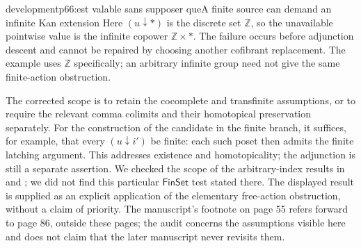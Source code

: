 \begin{dcomment}{development}{p66:est valable sans supposer que}{A finite source can demand an infinite Kan extension}
Here $(u\downarrow *)$ is the discrete set $\mathbb Z$, so the unavailable pointwise value is the infinite copower $\mathbb Z\times *$. The failure occurs before adjunction descent and cannot be repaired by choosing another cofibrant replacement. The example uses $\mathbb Z$ specifically; an arbitrary infinite group need not give the same finite-action obstruction.

The corrected scope is to retain the cocomplete and transfinite assumptions, or to require the relevant comma colimits and their homotopical preservation separately. For the construction of the candidate in the finite branch, it suffices, for example, that every $(u\downarrow i')$ be finite: each such poset then admits the finite latching argument. This addresses existence and homotopicality; the adjunction is still a separate assertion. We checked the scope of the arbitrary-index results in \citet[\S9.6]{RadulescuBanu2009} and \citet[\S2]{Cisinski2010}; we did not find this particular $\mathsf{FinSet}$ test stated there. The displayed result is supplied as an explicit application of the elementary free-action obstruction, without a claim of priority. The manuscript's footnote on page 55 refers forward to page 86, outside these pages; the audit concerns the assumptions visible here and does not claim that the later manuscript never revisits them.
\end{dcomment}

